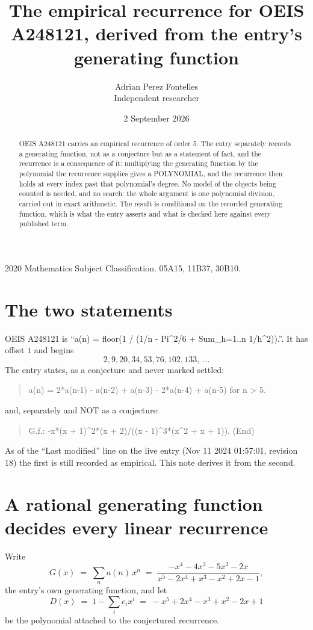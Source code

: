 \documentclass[11pt,a4paper]{article}
\title{The empirical recurrence for OEIS A248121, derived from the entry's generating function}
\author{Adrian Perez Fontelles\\ \small Independent researcher}
\date{2 September 2026}
\theoremstyle{plain}
\theoremstyle{definition}
\begin{document}
\maketitle

\begin{abstract}
OEIS A248121 carries an empirical recurrence of order $5$. The entry separately records a
generating function, not as a conjecture but as a statement of fact, and the recurrence is a
consequence of it: multiplying the generating function by the polynomial the recurrence
supplies gives a POLYNOMIAL, and the recurrence then holds at every index past that
polynomial's degree. No model of the objects being counted is needed, and no search: the
whole argument is one polynomial division, carried out in exact arithmetic. The result is
conditional on the recorded generating function, which is what the entry asserts and what is
checked here against every published term.
\end{abstract}

\noindent\small 2020 Mathematics Subject Classification. 05A15, 11B37, 30B10.\normalsize

\section{The two statements}

OEIS A248121 is ``a(n) = floor(1 / (1/n - Pi\^{}2/6 + Sum\_{h=1..n} 1/h\^{}2)).''. It has offset $1$ and begins
\[
2, 9, 20, 34, 53, 76, 102, 133,\ \dots
\]
The entry states, as a conjecture and never marked settled:
\begin{quote}
a(n) = 2*a(n-1) - a(n-2) + a(n-3) - 2*a(n-4) + a(n-5) for n > 5.
\end{quote}
and, separately and NOT as a conjecture:
\begin{quote}
G.f.: -x*(x + 1)\^{}2*(x + 2)/((x - 1)\^{}3*(x\^{}2 + x + 1)). (End)
\end{quote}
As of the ``Last modified'' line on the live entry (Nov 11 2024 01:57:01, revision 18) the first is still
recorded as empirical. This note derives it from the second.

\section{A rational generating function decides every linear recurrence}

Write
\[
G(x)\;=\;\sum_{n}a(n)\,x^{n}\;=\;\frac{- x^{4} - 4 x^{3} - 5 x^{2} - 2 x}{x^{5} - 2 x^{4} + x^{3} - x^{2} + 2 x - 1},
\]
the entry's own generating function, and let
\[
D(x)\;=\;1-\sum_i c_i x^{i}\;=\;- x^{5} + 2 x^{4} - x^{3} + x^{2} - 2 x + 1
\]
be the polynomial attached to the conjectured recurrence.
\end{document}
